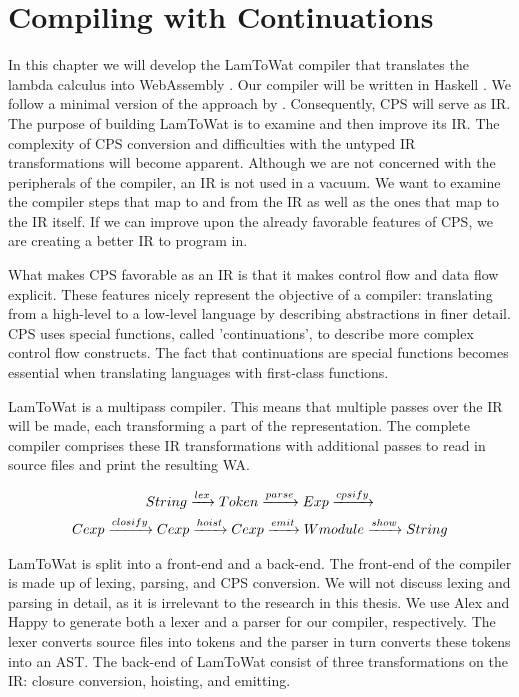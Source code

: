 
\chapter{\label{chap:cpscomp}Compiling with Continuations}
In this chapter we will develop the LamToWat compiler that translates the lambda calculus into WebAssembly \autocite{webassemblyhomepage}. Our compiler will be written in Haskell \autocite{haskellhomepage}. We follow a minimal version of the approach by \citeauthor{DBLP:books/daglib/0022396} \autocite{DBLP:books/daglib/0022396}. Consequently, \ac{CPS} will serve as \ac{IR}. The purpose of building LamToWat is to examine and then improve its \ac{IR}. The complexity of \ac{CPS} conversion and difficulties with the untyped \ac{IR} transformations will become apparent. Although we are not concerned with the peripherals of the compiler, an \ac{IR} is not used in a vacuum. We want to examine the compiler steps that map to and from the \ac{IR} as well as the ones that map to the \ac{IR} itself. If we can improve upon the already favorable features of \ac{CPS}, we are creating a better IR to program in.

What makes \ac{CPS} favorable as an \ac{IR} is that it makes control flow and data flow explicit. These features nicely represent the objective of a compiler: translating from a high-level to a low-level language by describing abstractions in finer detail. \ac{CPS} uses special functions, called 'continuations', to describe more complex control flow constructs. The fact that continuations are special functions becomes essential when translating languages with first-class functions.

LamToWat is a multipass compiler. This means that multiple passes over the \ac{IR} will be made, each transforming a part of the representation. The complete compiler comprises these \ac{IR} transformations with additional passes to read in source files and print the resulting \ac{WA}.

\begin{gather*}
  String \xrightarrow{lex} Token \xrightarrow{parse} Exp \xrightarrow{cpsify}\\
  Cexp \xrightarrow{closify} Cexp \xrightarrow{hoist} Cexp \xrightarrow{emit} Wmodule \xrightarrow{show} String
\end{gather*}

LamToWat is split into a front-end and a back-end. The front-end of the compiler is made up of lexing, parsing, and \ac{CPS} conversion. We will not discuss lexing and parsing in detail, as it is irrelevant to the research in this thesis. We use Alex \autocite{haskellalex} and Happy \autocite{haskellhappy} to generate both a lexer and a parser for our compiler, respectively. The lexer converts source files into tokens and the parser in turn converts these tokens into an \ac{AST}. The back-end of LamToWat consist of three transformations on the \ac{IR}: closure conversion, hoisting, and emitting.

